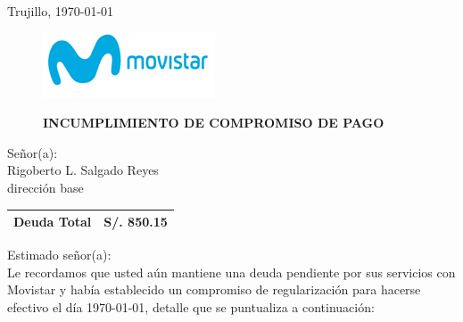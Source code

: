 %
%

\begin{flushright}
    Trujillo, \today
\end{flushright}
\vspace{-0.5cm}

\begin{figure}[h]
\begin{minipage}[b]{5.106458333cm}
\includegraphics[natwidth=5.106458333cm, natheight=1.931458333cm]{resources/business_logo.png}
\end{minipage}
\begin{minipage}[b][1.9314cm][t]{11cm}
\begin{flushright}
{\LARGE \bf INCUMPLIMIENTO DE COMPROMISO DE PAGO}
\end{flushright}
\end{minipage}
\end{figure}

\noindent
Señor(a):\\
Rigoberto L. Salgado Reyes\\
dirección base

\begin{flushright}
\bf \large
\begin{tabular}{|p{3.2cm} p{3.2cm}|}
\hline
Deuda Total & S/. 850.15 \\
\hline
\end{tabular}
\end{flushright}

\noindent
Estimado señor(a):\\
Le recordamos que usted aún mantiene una deuda pendiente por sus servicios con Movistar y había establecido un compromiso de regularización para hacerse efectivo el día \monthyeardate\today, detalle que se puntualiza a continuación:


